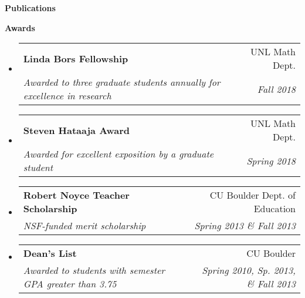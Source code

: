 \documentclass[letterpaper,11pt]{article}
\makeatletter
\newcommand{\resitem}[1]{\item #1 \vspace{-2pt}}
\newcommand{\resheading}[1]{{\large \colorbox{mygrey}{\begin{minipage}{\textwidth}{\textbf{#1 \vphantom{p\^{E}}}}\end{minipage}}}}
\newcommand{\ressubheading}[4]{
\begin{tabular*}{6.5in}{l@{\extracolsep{\fill}}r}
		\textbf{#1} & #2 \\
		\textit{#3} & \textit{#4} \\
\end{tabular*}\vspace{-6pt}}
\makeatother
\begin{document}
\begin{itemize}
{\begin{itemize}
				\end{itemize}
				}
	\end{itemize}

\resheading{Publications}

\nocite{*}
\printbibliography[heading=none]

\resheading{Awards}
\begin{itemize}
	\item
	\ressubheading{Linda Bors Fellowship}{UNL Math Dept.}{Awarded to three graduate students annually for excellence in research}{Fall 2018}
	\item
	\ressubheading{Steven Hataaja Award}{UNL Math Dept.}{Awarded for excellent exposition by a graduate student}{Spring 2018}
	\item
	\ressubheading{Robert Noyce Teacher Scholarship}{CU Boulder Dept. of Education}{NSF-funded merit scholarship}{Spring 2013 \& Fall 2013}
	\item
	\ressubheading{Dean's List}{CU Boulder}{Awarded to students with semester GPA greater than 3.75}{Spring 2010, Sp. 2013, \& Fall 2013}
\end{itemize}
	
\end{document}
